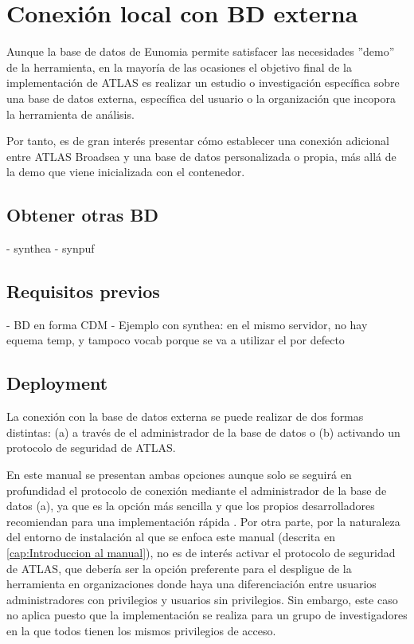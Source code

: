 \chapter{Conexión local con BD externa}

Aunque la base de datos de Eunomia permite satisfacer las necesidades ''demo'' de la herramienta, en la mayoría de las ocasiones el objetivo final de la implementación de ATLAS es realizar un estudio o investigación específica sobre una base de datos externa, específica del usuario o la organización que incopora la herramienta de análisis. 

Por tanto, es de gran interés presentar cómo establecer una conexión adicional entre ATLAS Broadsea y una base de datos personalizada o propia, más allá de la demo que viene inicializada con el contenedor.

\section{Obtener otras BD}

- synthea
- synpuf

\section{Requisitos previos} \label{cap:04RequisitosPrevios}

- BD en forma CDM
- Ejemplo con synthea: en el mismo servidor,  no hay equema temp, y tampoco vocab porque se va a utilizar el por defecto

\section{Deployment}

La conexión con la base de datos externa se puede realizar de dos formas distintas: (a) a través de el administrador de la base de datos o (b) activando un protocolo de seguridad de ATLAS. 

En este manual se presentan ambas opciones aunque solo se seguirá en profundidad el protocolo de conexión mediante el administrador de la base de datos (a), ya que es la opción más sencilla y que los propios desarrolladores recomiendan para una implementación rápida \cite{forumAddMSDB}. Por otra parte, por la naturaleza del entorno de instalación al que se enfoca este manual (descrita en \ref{cap:Introduccion al manual}), no es de interés activar el protocolo de seguridad de ATLAS, que debería ser la opción preferente para el despligue de la herramienta en organizaciones donde haya una diferenciación entre usuarios administradores con privilegios y usuarios sin privilegios. Sin embargo, este caso no aplica puesto que la implementación se realiza para un grupo de investigadores en la que todos tienen los mismos privilegios de acceso.

